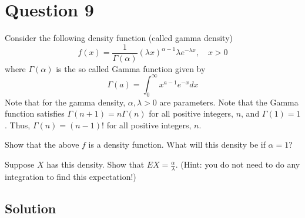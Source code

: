 \section*{Question 9}

Consider the following density function (called gamma density)
\begin{equation*}
    f(x)=\frac{1}{\Gamma(\alpha)}(\lambda x)^{\alpha-1} \lambda e^{-\lambda x}, \quad x>0
\end{equation*}
where \( \Gamma(\alpha) \) is the so called Gamma function given by
\begin{equation*}
    \Gamma(a)=\int_{0}^{\infty} x^{a-1} e^{-x} d x
\end{equation*}
Note that for the gamma density, \( \alpha, \lambda>0 \) are parameters.
Note that the Gamma function satisfies \( \Gamma(n+1)=n \Gamma(n) \) for all positive integers, \( n \), and \( \Gamma(1)=1 \).
Thus, \( \Gamma(n)=(n-1)! \) for all positive integers, \( n \).

Show that the above \( f \) is a density function. What will this density be if \( \alpha=1 \)?

Suppose \( X \) has this density.
Show that \( E X=\frac{\alpha}{\lambda} \).
(Hint: you do not need to do any integration to find this expectation!)

\subsection*{Solution}
